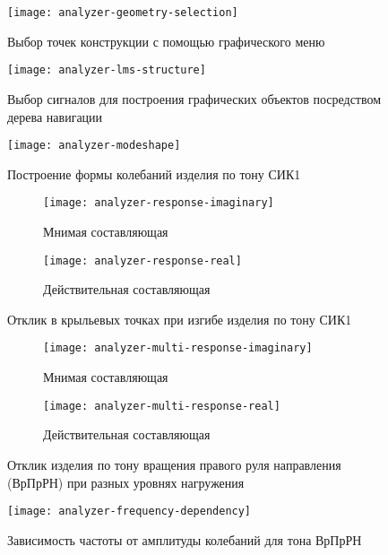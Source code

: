 \begin{figure}[H]
	\centerfloat
	\texttt{[image: analyzer-geometry-selection]}
	\caption{Выбор точек конструкции с помощью графического меню} \label{fig:analyzer-geometry-selection}
\end{figure}

\begin{figure}[H]
	\centerfloat
	\texttt{[image: analyzer-lms-structure]}
	\caption{Выбор сигналов для построения графических объектов посредством дерева навигации } \label{fig:analyzer-lms-structure}
\end{figure}

\begin{figure}[H]
	\centerfloat
	\texttt{[image: analyzer-modeshape]}
	\caption{Построение формы колебаний изделия по тону СИК1} \label{fig:analyzer-modeshape}
\end{figure}

\begin{figure}[H]
	\centering
	\begin{subfigure}{0.49\textwidth}
		\texttt{[image: analyzer-response-imaginary]}
		\caption{Мнимая составляющая}
	\end{subfigure}
	\hfill
	\begin{subfigure}{0.49\textwidth}
		\texttt{[image: analyzer-response-real]}
		\caption{Действительная составляющая}
	\end{subfigure}
     \caption{Отклик в крыльевых точках при изгибе изделия по тону СИК1} \label{fig:analyzer-response}
\end{figure}

\begin{figure}[H]
	\centering
	\begin{subfigure}{0.49\textwidth}
		\texttt{[image: analyzer-multi-response-imaginary]}
		\caption{Мнимая составляющая}
	\end{subfigure}
	\hfill
	\begin{subfigure}{0.49\textwidth}
		\texttt{[image: analyzer-multi-response-real]}
		\caption{Действительная составляющая}
	\end{subfigure}
     \caption{Отклик изделия по тону вращения правого руля направления (ВрПрРН) при разных уровнях нагружения} \label{fig:analyzer-multi-response}
\end{figure}

\begin{figure}[H]
	\centerfloat
	\texttt{[image: analyzer-frequency-dependency]}
	\caption{Зависимость частоты от амплитуды колебаний для тона ВрПрРН} \label{fig:analyzer-frequency-dependency}
\end{figure}

